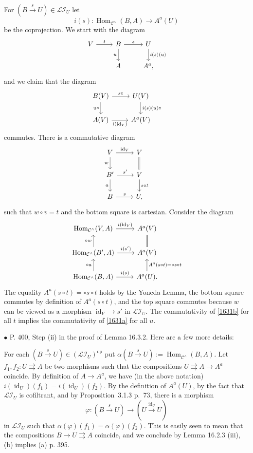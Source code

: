 \documentclass[12pt]{article}
\theoremstyle{remark}%
\newcommand{\bu}{\bullet}
\newcommand{\n}{\noindent}
\newcommand{\cc}{\mathcal}
\newcommand{\C}{\mathcal C}
\newcommand{\mc}{\mathcal}
\newcommand{\p}{\varphi}
\newcommand{\pa}{\rightrightarrows}
\newcommand{\xr}{\xrightarrow}
\newcommand{\be}{\begin{equation}}
\newcommand{\ee}{\end{equation}}
\newcommand{\pr}{Proposition}
\DeclareMathOperator{\id}{id}
\DeclareMathOperator{\h}{Hom}
\DeclareMathOperator{\op}{op}
\begin{document}
For $(B\xr s U)\in\mc{LI}_U$ let 
$$
i(s):\h_{\C^\wedge}(B,A)\to A^a(U)
$$ 
be the coprojection. We start with the diagram 
$$
\begin{tikzcd}
%
V\ar{r}{t}&B\ar{d}[swap]{u}\ar{r}{s}&U\ar{d}{i(s)(u)}\\ 
{}&A&A^a,
%
\end{tikzcd}
$$ 
and we claim that the diagram 
\be\label{1631a}
\begin{tikzcd}
%
B(V)\ar{d}[swap]{u\circ}\ar{r}{s\circ}&U(V)\ar{d}{i(s)(u)\circ}\\ 
A(V)\ar{r}[swap]{i(\id_V)}&A^a(V)
%
\end{tikzcd}
\ee 
commutes. There is a commutative diagram 
$$
\begin{tikzcd}
%
V\ar{d}[swap]{w}\ar{r}{\id_V}&V\ar[equal]{d}\\ 
B'\ar{d}[swap]{a}\ar{r}{s'}&V\ar{d}{s\circ t}\\ 
B\ar{r}{s}&U,
%
\end{tikzcd}
$$ 
such that $w\circ v=t$ and the bottom square is cartesian. Consider the diagram 
%
\be\label{1631b}
\begin{tikzcd}
%
\h_{\C^\wedge}(V,A)\ar{r}{i(\id_V)}&A^a(V)\ar[equal]{d}\\ 
\h_{\C^\wedge}(B',A)\ar{u}{\circ w}\ar{r}{i(s')}&A^a(V)\\ 
\h_{\C^\wedge}(B,A)\ar{u}{\circ a}\ar{r}{i(s)}&A^a(U)\ar{u}[swap]{A^a(s\circ t)=\circ s\circ t}.
%
\end{tikzcd}
\ee
% 
The equality $A^a(s\circ t)=\circ s\circ t$ holds by the Yoneda Lemma, the bottom square commutes by definition of $A^a(s\circ t)$, and the top square commutes because $w$ can be viewed as a morphism $\id_V\to s'$ in $\mc{LI}_U$. The commutativity of \eqref{1631b} for all $t$ implies the commutativity of \eqref{1631a} for all $u$. 


\n$\bu$ P. 400, Step (ii) in the proof of Lemma 16.3.2. Here are a few more details: 

For each $(B\xr sU)\in(\cc{LI}_U)^{\op}$ put $\alpha(B\xr sU):=\h_{\C^\wedge}(B,A)$. Let $f_1,f_2:U\pa A$ be two morphisms such that the compositions $U\pa A\to A^a$ coincide. By definition of $A\to A^a$, we have (in the above notation) $i(\id_U)(f_1)=i(\id_U)(f_2)$. By the definition of $A^a(U)$, by the fact that $\cc{LI}_U$ is cofiltrant, and by \pr\ 3.1.3 p.~73, there is a morphism 
$$
\p:(B\xr sU)\to(U\xr{\id_U}U)
$$ 
in $\cc{LI}_U$ such that $\alpha(\p)(f_1)=\alpha(\p)(f_2)$. This is easily seen to mean that the compositions $B\to U\pa A$ coincide, and we conclude by Lemma 16.2.3 (iii), (b) implies (a) p. 395.
\end{document}
